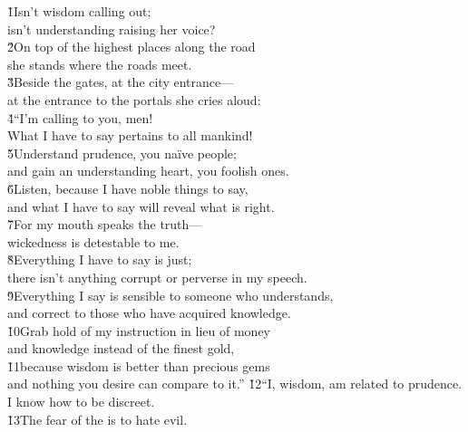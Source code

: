 \begin{poetry}
\poeml {}
\v{1}Isn't wisdom calling out; \\
\poeml isn't understanding raising her voice? \\
\poeml \v{2}On top of the highest places along the road \\
\poemll    she stands where the roads meet. \\
\poeml \v{3}Beside the gates, at the city entrance--- \\
\poemll    at the entrance to the portals she cries aloud: \\
\poeml \v{4}``I'm calling to you, men! \\
\poemll    What I have to say pertains to all mankind! \\
\poeml \v{5}Understand prudence, you na\"{i}ve people; \\
\poemll    and gain an understanding heart, you foolish ones. \\
\poeml \v{6}Listen, because I have noble things to say, \\
\poemll    and what I have to say will reveal what is right. \\
\poeml \v{7}For my mouth speaks the truth--- \\
\poemll    wickedness is detestable to me. \\
\poeml \v{8}Everything I have to say is just; \\
\poemll    there isn't anything corrupt or perverse in my speech. \\
\poeml \v{9}Everything I say is sensible to someone who understands, \\
\poemll    and correct to those who have acquired knowledge. \\
\poeml \v{10}Grab hold of my instruction in lieu of money \\
\poemll    and knowledge instead of the finest gold, \\
\poeml \v{11}because wisdom is better than precious gems \\
\poemll    and nothing you desire can compare to it.''
\poeml \v{12}``I, wisdom, am related to prudence. \\
\poemll    I know how to be discreet. \\
\poeml \v{13}The fear of the  is to hate evil. \\

\end{poetry}
